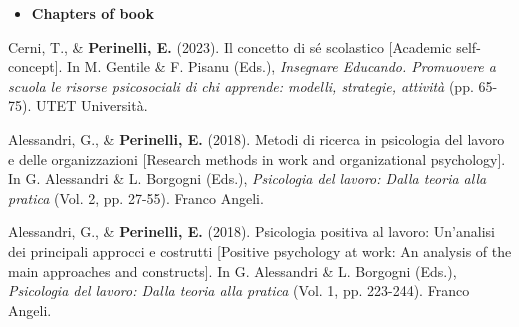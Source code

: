 \documentclass[hidelinks, letterpaper,10pt]{article} %
\begin{document}
\begin{itemize}
	\setlength{\topsep}{0pt}%
	\setlength{\leftmargin}{0.1in}%
	\setlength{\listparindent}{-0.1in}%
	\setlength{\itemindent}{-0.2in}%
	\setlength{\parsep}{\parskip}%
	
	\item {\textbf{\large{Chapters of book}}}
\end{itemize}
\begin{etaremune}
    \item Cerni, T., \& \textbf{Perinelli, E.} (2023). Il concetto di sé scolastico [Academic self-concept]. In M. Gentile \& F. Pisanu (Eds.), \textit{Insegnare Educando. Promuovere a scuola le risorse psicosociali di chi apprende: modelli, strategie, attività} (pp. 65-75). UTET Università.

    
	\item Alessandri, G., \& \textbf{Perinelli, E.} (2018). Metodi di ricerca in psicologia del lavoro e delle organizzazioni [Research methods in work and organizational psychology]. In G. Alessandri \& L. Borgogni (Eds.), \textit{Psicologia del lavoro: Dalla teoria alla pratica} (Vol. 2, pp. 27-55). Franco Angeli.

    \item Alessandri, G., \& \textbf{Perinelli, E.} (2018). Psicologia positiva al lavoro: Un’analisi dei principali approcci e costrutti [Positive psychology at work: An analysis of the main approaches and constructs]. In G. Alessandri \& L. Borgogni (Eds.), \textit{Psicologia del lavoro: Dalla teoria alla pratica} (Vol. 1, pp. 223-244). Franco Angeli.
\end{etaremune}
\vspace{3mm}
\end{document}
